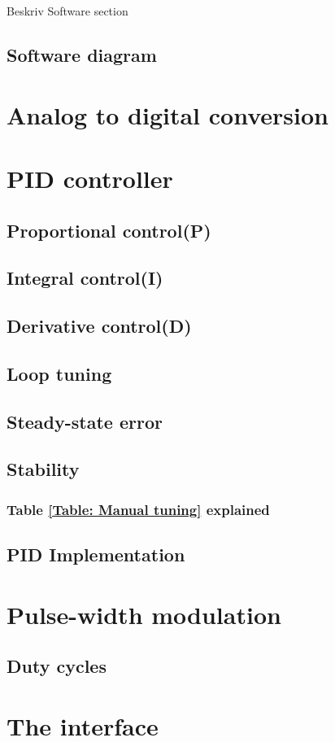
Beskriv Software section

\subsection{Software diagram}

\section{Analog to digital conversion}

\section{PID controller} 

\subsection {Proportional control(P)}

\subsection {Integral control(I)}

\subsection {Derivative control(D)} 

\subsection {Loop tuning} 

\subsection {Steady-state error}

\subsection {Stability} 

\subsubsection {Table \ref{Table: Manual tuning} explained}

\subsection{PID Implementation}

\section{Pulse-width modulation}

\subsection{Duty cycles}

\section{The interface}
